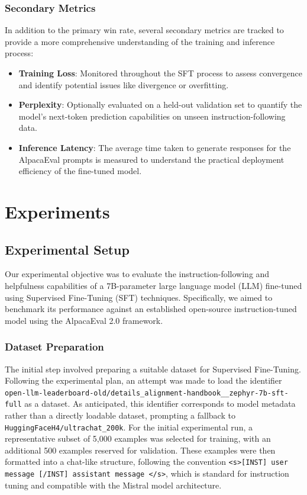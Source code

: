 \documentclass[11pt]{article}
\begin{document}
\subsubsection{Secondary Metrics}
In addition to the primary win rate, several secondary metrics are tracked to provide a more comprehensive understanding of the training and inference process:
\begin{itemize}
    \item \textbf{Training Loss}: Monitored throughout the SFT process to assess convergence and identify potential issues like divergence or overfitting.
    \item \textbf{Perplexity}: Optionally evaluated on a held-out validation set to quantify the model's next-token prediction capabilities on unseen instruction-following data.
    \item \textbf{Inference Latency}: The average time taken to generate responses for the AlpacaEval prompts is measured to understand the practical deployment efficiency of the fine-tuned model.
\end{itemize}

\section{Experiments}

\subsection{Experimental Setup}
Our experimental objective was to evaluate the instruction-following and helpfulness capabilities of a 7B-parameter large language model (LLM) fine-tuned using Supervised Fine-Tuning (SFT) techniques. Specifically, we aimed to benchmark its performance against an established open-source instruction-tuned model using the AlpacaEval 2.0 framework.

\subsubsection{Dataset Preparation}
The initial step involved preparing a suitable dataset for Supervised Fine-Tuning. Following the experimental plan, an attempt was made to load the identifier \texttt{open-llm-leaderboard-old/details\_alignment-handbook\_\_zephyr-7b-sft-full} as a dataset. As anticipated, this identifier corresponds to model metadata rather than a directly loadable dataset, prompting a fallback to \texttt{HuggingFaceH4/ultrachat\_200k}. For the initial experimental run, a representative subset of 5,000 examples was selected for training, with an additional 500 examples reserved for validation. These examples were then formatted into a chat-like structure, following the convention \texttt{<s>{[}INST{]} user message {[/}INST{]} assistant message </s>}, which is standard for instruction tuning and compatible with the Mistral model architecture.
\end{document}
